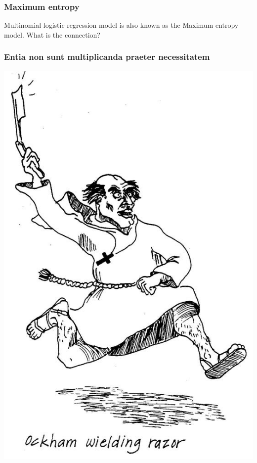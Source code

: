 \documentclass[14pt,mathserif,dvipsnames,usenames]{beamer}
\newcommand{\voc}[1]{{\color{ForestGreen}#1}}
\begin{document}
\begin{frame}
  \frametitle{Maximum entropy}
  \begin{block}
    {}
Multinomial logistic regression model is also known as the \voc{Maximum entropy
model}. What is the connection?
  \end{block}
\end{frame}

\begin{frame}\frametitle{Entia non sunt multiplicanda praeter necessitatem}
 \begin{center}
 \includegraphics[]{ockham_razor.jpg}
\end{center}
\end{frame}
\end{document}
